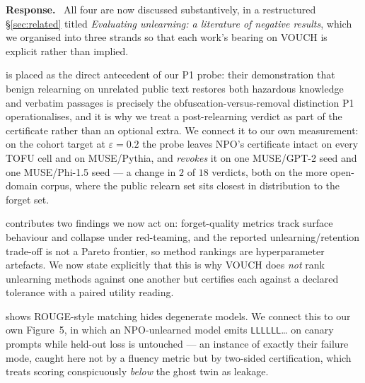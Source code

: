 \documentclass[11pt,a4paper]{article}
\newcommand{\eps}{\varepsilon}
\newenvironment{reply}{%
  \par\smallskip\noindent\textbf{\color{acol}Response.}\ \begingroup}{\endgroup\par}
\begin{document}
\begin{reply}
All four are now discussed substantively, in a restructured \S\ref{sec:related} titled
\emph{Evaluating unlearning: a literature of negative results}, which we organised into
three strands so that each work's bearing on VOUCH is explicit rather than implied.

\citet{hu2025jogging} is placed as the direct antecedent of our P1 probe: their
demonstration that benign relearning on unrelated public text restores both hazardous
knowledge and verbatim passages is precisely the obfuscation-versus-removal distinction
P1 operationalises, and it is why we treat a post-relearning verdict as part of the
certificate rather than an optional extra. We connect it to our own measurement: on the
cohort target at $\eps = 0.2$ the probe leaves NPO's certificate intact on every TOFU
cell and on MUSE/Pythia, and \emph{revokes} it on one MUSE/GPT-2 seed and one
MUSE/Phi-1.5 seed --- a change in $2$ of $18$ verdicts, both on the more open-domain
corpus, where the public relearn set sits closest in distribution to the forget set.

\citet{wang2025towards} contributes two findings we now act on: forget-quality metrics
track surface behaviour and collapse under red-teaming, and the reported
unlearning/retention trade-off is not a Pareto frontier, so method rankings are
hyperparameter artefacts. We now state explicitly that this is why VOUCH does
\emph{not} rank unlearning methods against one another but certifies each against a
declared tolerance with a paired utility reading.

\citet{yuan2025closer} shows ROUGE-style matching hides degenerate models. We connect
this to our own Figure~5, in which an NPO-unlearned model emits \texttt{LLLLLL}\ldots{}
on canary prompts while held-out loss is untouched --- an instance of exactly their
failure mode, caught here not by a fluency metric but by two-sided certification, which
treats scoring conspicuously \emph{below} the ghost twin as leakage.


\end{reply}
\end{document}
